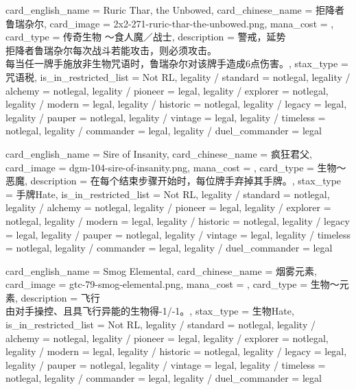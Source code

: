 \documentclass[lang = cn, color = black, 10pt]{AllThatStax}
\begin{document}
\card
{
	card_english_name = {Ruric Thar, the Unbowed},
	card_chinese_name = {拒降者鲁瑞杂尔},
	card_image = 2x2-271-ruric-thar-the-unbowed.png,
	mana_cost = ,
	card_type = 传奇生物 ～食人魔／战士,
	description = {警戒，延势\\
		拒降者鲁瑞杂尔每次战斗若能攻击，则必须攻击。\\
		每当任一牌手施放非生物咒语时，鲁瑞杂尔对该牌手造成6点伤害。},
	stax_type = 咒语税,
	is_in_restricted_list = Not RL,
	legality / standard = notlegal,
	legality / alchemy = notlegal,
	legality / pioneer = legal,
	legality / explorer = notlegal,
	legality / modern = legal,
	legality / historic = notlegal,
	legality / legacy = legal,
	legality / pauper = notlegal,
	legality / vintage = legal,
	legality / timeless = notlegal,
	legality / commander = legal,
	legality / duel_commander = legal
}

\card
{
	card_english_name = {Sire of Insanity},
	card_chinese_name = {疯狂君父},
	card_image = dgm-104-sire-of-insanity.png,
	mana_cost = ,
	card_type = 生物～恶魔,
	description = {在每个结束步骤开始时，每位牌手弃掉其手牌。},
	stax_type = 手牌Hate,
	is_in_restricted_list = Not RL,
	legality / standard = notlegal,
	legality / alchemy = notlegal,
	legality / pioneer = legal,
	legality / explorer = notlegal,
	legality / modern = legal,
	legality / historic = notlegal,
	legality / legacy = legal,
	legality / pauper = notlegal,
	legality / vintage = legal,
	legality / timeless = notlegal,
	legality / commander = legal,
	legality / duel_commander = legal
}

\card
{
	card_english_name = {Smog Elemental},
	card_chinese_name = {烟雾元素},
	card_image = gtc-79-smog-elemental.png,
	mana_cost = ,
	card_type = 生物～元素,
	description = {飞行\\
		由对手操控、且具飞行异能的生物得-1/-1。},
	stax_type = 生物Hate,
	is_in_restricted_list = Not RL,
	legality / standard = notlegal,
	legality / alchemy = notlegal,
	legality / pioneer = legal,
	legality / explorer = notlegal,
	legality / modern = legal,
	legality / historic = notlegal,
	legality / legacy = legal,
	legality / pauper = notlegal,
	legality / vintage = legal,
	legality / timeless = notlegal,
	legality / commander = legal,
	legality / duel_commander = legal
}
\end{document}

